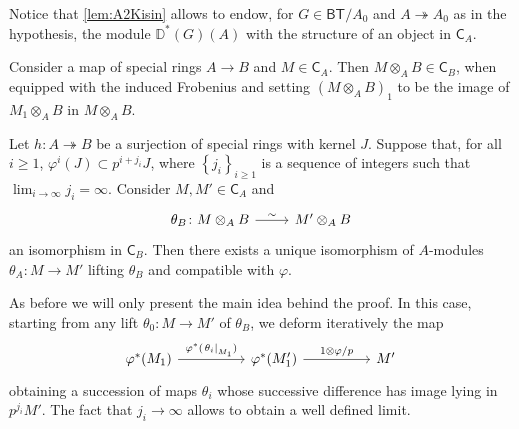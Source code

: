 \begin{rem}[]
	Notice that \cref{lem:A2Kisin} allows to endow,
	for $G \in \mathsf{BT}/A_0$ and $A \twoheadrightarrow A_0$ as in the hypothesis,
	the module $\mathbb{D}^*(G)(A)$ with the structure of an object in $\mathsf{C}_A$.
\end{rem}


\begin{defn}[]
	Consider a map of special rings $A \to B$ and $M \in \mathsf{C}_A$.
	Then $M \otimes_A B \in \mathsf{C}_B$, when equipped with
	the induced Frobenius %
	and setting
	$\left( M \otimes_A B \right)_1$ to be the image of
	$M_1 \otimes_A B$ in $M \otimes_A B$.
\end{defn}


\begin{lem}\label{lem:A4Kisin}
	Let $h\colon A \twoheadrightarrow B$ be a surjection of special rings with kernel $J$.
	Suppose that, for all $i \geq 1$, $\varphi^i(J) \subset p^{i + j_i} J$,
	where $\left\{ j_i \right\}_{i \geq 1}$ is a sequence of integers
	such that $\lim_{i \to \infty} j_i = \infty$.
	Consider $M, M' \in \mathsf{C}_A$ and
	\begin{equation*}
	\begin{tikzcd}[row sep = 0ex
		,/tikz/column 1/.append style={anchor=base east}
		,/tikz/column 2/.append style={anchor=base west}]
		\theta_B\colon M \otimes_A B 
		\arrow[r, "\sim", rightarrow] &
		M' \otimes_A B
	\end{tikzcd}
	\end{equation*} 
	an isomorphism in $\mathsf{C}_B$.
	Then there exists a unique isomorphism of $A$-modules
	$\theta_A\colon M \to M'$ lifting $\theta_B$ and compatible with $\varphi$.
\end{lem} 


\begin{rem}[]
	As before we will only present the main idea behind the proof.
	In this case, starting from any lift $\theta_0\colon M \to M'$
	of $\theta_B$, we deform iteratively the map
	\begin{equation*}
	\begin{tikzcd}[column sep=4.8em]
		\varphi^*(M_1) \arrow[r, "\varphi^*(\left.\theta_i\right|_{ M_1 })", rightarrow] &
		\varphi^*(M_1') \arrow[r, "1 \otimes \varphi/p", rightarrow] &
		M'
	\end{tikzcd}
	\end{equation*}
	obtaining a succession of maps $\theta_i$ whose successive difference
	has image lying in $p^{j_i}M'$.
	The fact that $j_i \to \infty$ allows to obtain a well defined limit.
\end{rem}


